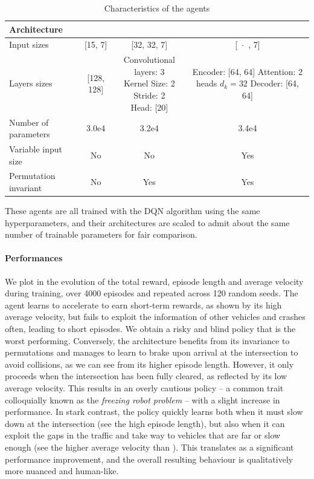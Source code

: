 \begin{table}[tp]
	\centering
	\begin{threeparttable}
		\caption{Characteristics of the agents}
		\label{tab:agents}
		\begin{tabular}{lccc}
			\toprule
			Architecture & \MLPL & \CNNG & \EgoAtt \\
			\midrule 
			Input sizes & [15, 7] & [32, 32, 7] & [~$\boldsymbol{\cdot}$~, 7] \\
			Layers sizes & [128, 128] &  \makecell[tc]{Convolutional layers: 3 \\ Kernel Size: 2 \\
				Stride: 2 \\ Head: [20]} & \makecell[tl]{Encoder: [64, 64] \\Attention: 2 heads\\\phantom{Attention: }$d_k=32$ \\ Decoder: [64, 64]} \\
			Number of parameters & 3.0e4 & 3.2e4 & 3.4e4 \\
			Variable input size & No & No &  {Yes}  \\
			Permutation invariant & No & {Yes} &  {Yes} \\
			\bottomrule
		\end{tabular}
	\end{threeparttable}
\end{table}

These agents are all trained with the \gls{DQN} algorithm using the same hyperparameters, and their architectures are scaled to admit about the same number of trainable parameters for fair comparison.

\paragraph{Performances}

We plot in  the evolution of the total reward, episode length and average velocity during training, over 4000 episodes and repeated across 120 random seeds.
The \MLPL agent learns to accelerate to earn short-term rewards, as shown by its high average velocity, but fails to exploit the information of other vehicles and crashes often, leading to short episodes. We obtain a risky and blind policy that is the worst performing.
Conversely, the \CNNG architecture benefits from its invariance to permutations and manages to learn to brake upon arrival at the intersection to avoid collisions, as we can see from its higher episode length. However, it only proceeds when the intersection has been fully cleared, as reflected by its low average velocity. This results in an overly cautious policy -- a common trait colloquially known as the \emph{freezing robot problem} \citep{Trautman2010} -- with a slight increase in performance.
In stark contrast, the \EgoAtt policy quickly learns both when it must slow down at the intersection (see the high episode length), but also when it can exploit the gaps in the traffic and take way to vehicles that are far or slow enough (see the higher average velocity than \CNNG). This translates as a significant performance improvement, and the overall resulting behaviour is qualitatively more nuanced and human-like.


